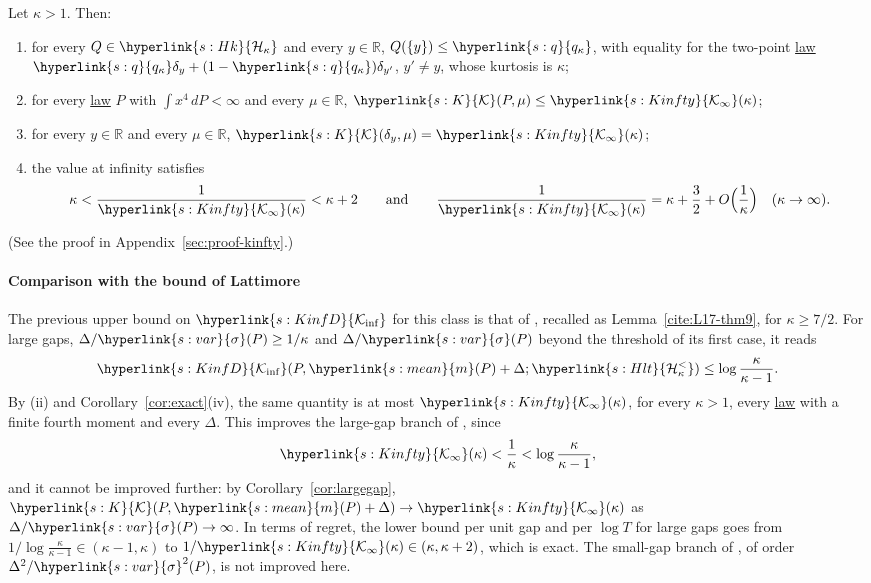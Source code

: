 \documentclass[11pt]{article}
\newcommand{\R}{\mathbb{R}}
\newcommand{\sy}[2]{{\hyperlink{#1}{#2}}}
\newcommand{\term}[2]{\hyperlink{#1}{#2}}
\newcommand{\mean}{\sy{s:mean}{m}}
\newcommand{\sd}{\sy{s:var}{\sigma}}
\newcommand{\Kinf}{\sy{s:KinfD}{\mathcal{K}_{\inf}}}
\newcommand{\Hk}{\sy{s:Hk}{\mathcal{H}_{\kappa}}}
\newcommand{\Hlt}{\sy{s:Hlt}{\mathcal{H}^{<}_{\kappa}}}
\newcommand{\Kc}{\sy{s:K}{\mathcal{K}}}
\newcommand{\qk}{\sy{s:q}{q_{\kappa}}}
\newcommand{\Kinfty}{\sy{s:Kinfty}{\mathcal{K}_{\infty}}}
\begin{document}
\begin{proposition}\label{prop:kinfty}
Let $\kappa>1$. Then:
\begin{enumerate}[label=(\roman*)]
  \item for every $Q\in\Hk$ and every $y\in\R$, $Q(\{y\})\le\qk$, with equality for the two-point \term{w:law}{law}
  $\qk\delta_y+(1-\qk)\delta_{y'}$, $y'\ne y$, whose kurtosis is $\kappa$;
  \item for every \term{w:law}{law} $P$ with $\int x^4\,dP<\infty$ and every $\mu\in\R$, $\Kc(P,\mu)\le\Kinfty(\kappa)$;
  \item for every $y\in\R$ and every $\mu\in\R$, $\Kc(\delta_y,\mu)=\Kinfty(\kappa)$;
  \item the value at infinity satisfies
  \begin{equation*}
    \kappa<\frac1{\Kinfty(\kappa)}<\kappa+2\qquad\text{and}\qquad\frac1{\Kinfty(\kappa)}=\kappa+\frac32+O\Bigl(\frac1\kappa\Bigr)\quad(\kappa\to\infty).
  \end{equation*}
\end{enumerate}
\end{proposition}

(See the proof in Appendix~\ref{sec:proof-kinfty}.)

\paragraph{Comparison with the bound of Lattimore} The previous upper bound on $\Kinf$ for this class is
that of \citet[Theorem~9]{L17}, recalled as Lemma~\ref{cite:L17-thm9}, for $\kappa\ge7/2$. For large gaps, $\Delta/\sd(P)\ge1/\kappa$ and
$\Delta/\sd(P)$ beyond the threshold of its first case, it reads
\begin{equation*}
  \Kinf(P,\mean(P)+\Delta;\Hlt)\le\log\frac{\kappa}{\kappa-1}.
\end{equation*}
By (ii) and Corollary~\ref{cor:exact}(iv), the same quantity is at most $\Kinfty(\kappa)$, for every $\kappa>1$, every \term{w:law}{law}
with a finite fourth moment and every $\Delta$. This improves the large-gap branch of \citet[Theorem~9]{L17}, since
\begin{equation*}
  \Kinfty(\kappa)<\frac1\kappa<\log\frac{\kappa}{\kappa-1},
\end{equation*}
and it cannot be improved further: by Corollary~\ref{cor:largegap}, $\Kc(P,\mean(P)+\Delta)\to\Kinfty(\kappa)$ as
$\Delta/\sd(P)\to\infty$. In terms of regret, the lower bound per unit gap and per $\log T$ for large gaps goes from
$1/\log\frac\kappa{\kappa-1}\in(\kappa-1,\kappa)$ to $1/\Kinfty(\kappa)\in(\kappa,\kappa+2)$, which is exact. The small-gap branch of
\citet[Theorem~9]{L17}, of order $\Delta^2/\sd^2(P)$, is not improved here.
\end{document}
